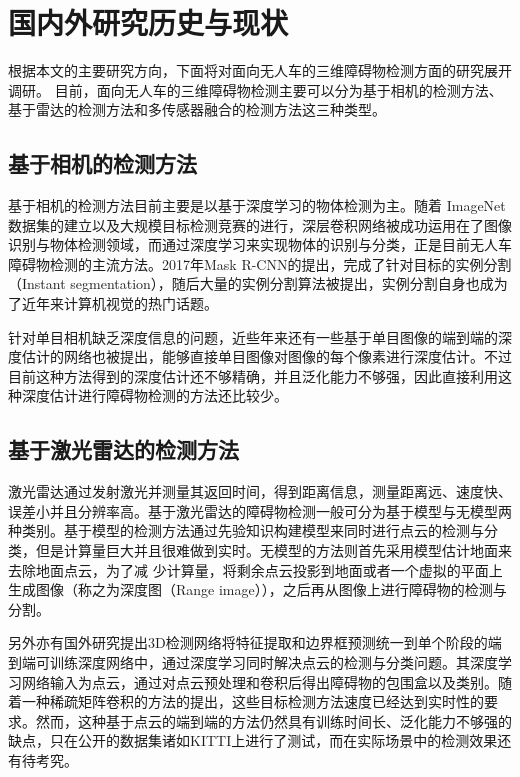 \section{国内外研究历史与现状}
根据本文的主要研究方向，下面将对面向无人车的三维障碍物检测方面的研究展开调研。
目前，面向无人车的三维障碍物检测主要可以分为基于相机的检测方法、基于雷达的检测方法和多传感器融合的检测方法这三种类型。
\subsection{基于相机的检测方法}
基于相机的检测方法目前主要是以基于深度学习的物体检测为主。随着 ImageNet数据集的建立以及大规模目标检测竞赛的进行，深层卷积网络被成功运用在了图像识别与物体检测领域，而通过深度学习来实现物体的识别与分类，正是目前无人车障碍物检测的主流方法。2017年Mask R-CNN的提出，完成了针对目标的实例分割（Instant segmentation），随后大量的实例分割算法被提出，实例分割自身也成为了近年来计算机视觉的热门话题。

针对单目相机缺乏深度信息的问题，近些年来还有一些基于单目图像的端到端的深度估计的网络也被提出，能够直接单目图像对图像的每个像素进行深度估计。不过目前这种方法得到的深度估计还不够精确，并且泛化能力不够强，因此直接利用这种深度估计进行障碍物检测的方法还比较少。

\subsection{基于激光雷达的检测方法}
激光雷达通过发射激光并测量其返回时间，得到距离信息，测量距离远、速度快、误差小并且分辨率高。基于激光雷达的障碍物检测一般可分为基于模型与无模型两种类别。基于模型的检测方法通过先验知识构建模型来同时进行点云的检测与分类，但是计算量巨大并且很难做到实时。无模型的方法则首先采用模型估计地面来去除地面点云，为了减 少计算量，将剩余点云投影到地面或者一个虚拟的平面上生成图像（称之为深度图（Range image）），之后再从图像上进行障碍物的检测与分割。

另外亦有国外研究提出3D检测网络将特征提取和边界框预测统一到单个阶段的端到端可训练深度网络中，通过深度学习同时解决点云的检测与分类问题。其深度学习网络输入为点云，通过对点云预处理和卷积后得出障碍物的包围盒以及类别。随着一种稀疏矩阵卷积的方法的提出，这些目标检测方法速度已经达到实时性的要求。然而，这种基于点云的端到端的方法仍然具有训练时间长、泛化能力不够强的缺点，只在公开的数据集诸如KITTI上进行了测试，而在实际场景中的检测效果还有待考究。


